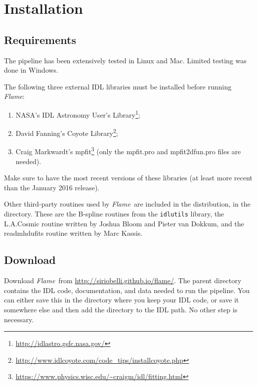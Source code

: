 \documentclass[a4paper]{article}
\newcommand{\flame}{\emph{Flame}}
\begin{document}
\begin{sloppypar}
\section{Installation}
\label{sec:installation}


\subsection{Requirements}

The pipeline has been extensively tested in Linux and Mac. Limited testing was done in Windows.

The following three external IDL libraries must be installed before running \flame:
\begin{enumerate}
\item NASA's IDL Astronomy User's Library\footnote{\url{http://idlastro.gsfc.nasa.gov/}};
\item David Fanning's Coyote Library\footnote{\url{http://www.idlcoyote.com/code_tips/installcoyote.php}};
\item Craig Markwardt's mpfit\footnote{\url{https://www.physics.wisc.edu/~craigm/idl/fitting.html}} (only the mpfit.pro and mpfit2dfun.pro files are needed).
\end{enumerate}
Make sure to have the most recent versions of these libraries (at least more recent than the January 2016 release).

Other third-party routines used by \flame\ are included in the distribution, in the  directory. These are the B-spline routines from the \texttt{idlutils} library, the L.A.Cosmic routine written by Joshua Bloom and Pieter van Dokkum, and the readmhdufits routine written by Marc Kassis.


\subsection{Download}

Download \flame\ from \url{http://siriobelli.github.io/flame/}. The parent directory  contains the IDL code, documentation, and data needed to run the pipeline. You can either save this in the directory where you keep your IDL code, or save it somewhere else and then add the  directory to the IDL path. No other step is necessary.









\end{sloppypar}
\end{document}

